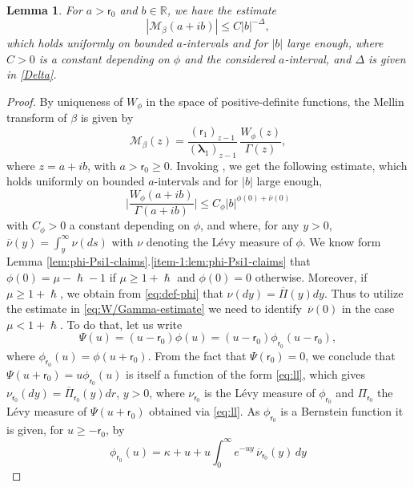 \documentclass[10pt]{amsart}
\theoremstyle{plain}
\newtheorem{lemma}[theorem]{Lemma}
\theoremstyle{definition}
\newcommand{\R}{\mathbb{R}}
\newcommand{\calM}{\mathcal{M}}
\newcommand{\lam}{{\bm{\lambda}_1}}
\newcommand{\tet}{{\mathsf{r}_0}}
\newcommand{\vat}{{\mathsf{r}_1}}
\let\h\hslash
\let\mo\mu
\let\bpsi\beta
\begin{document}
\begin{lemma}
\label{lem:Mellin-bpsi}
For $a > \tet$ and $b \in \R$, we have the estimate
\begin{equation*}
\left| \calM_\bpsi(a+ib) \right| \leq C|b|^{-\Delta},
\end{equation*}
which holds uniformly on bounded $a$-intervals and for $|b|$ large enough,
where $C > 0$ is a constant depending on $\phi$ and the considered $a$-interval, and $\Delta$ is given in \eqref{Delta}.
\end{lemma}

\begin{proof}
By uniqueness of $W_\phi$ in the space of positive-definite functions, the Mellin transform of $\bpsi$ is given by
\begin{equation*}
\calM_\bpsi(z) = \frac{(\vat)_{z-1}}{(\lam)_{z-1}}\,\frac{W_\phi(z)}{\Gamma(z)},
\end{equation*}
where $z = a+ib$, with $a > \tet \geq 0$. Invoking \cite[Eq.\,(6.20)]{Patie-Savov-Bern}, we get the following estimate, which holds uniformly on bounded $a$-intervals and for $|b|$ large enough,
\begin{equation}
\label{eq:W/Gamma-estimate}
\biggl| \frac{W_\phi(a+ib)}{\Gamma(a+ib)}\biggr| \leq C_\phi |b|^{\phi(0)+\overline{\nu}(0)}
\end{equation}
with $C_\phi > 0$ a constant depending on $\phi$, and where, for any $y > 0$, $\overline{\nu}(y) = \int_y^\infty \nu(ds)$ with $\nu$ denoting the Lévy measure of $\phi$. We know form Lemma \ref{lem:phi-Psi1-claims}.\eqref{item-1:lem:phi-Psi1-claims}
that $\phi(0) = \mo-\h - 1$ if $\mo \ge 1+\h$ and $\phi(0) = 0$ otherwise.
Moreover, if $\mo \ge 1+\h$, we obtain from \eqref{eq:def-phi} that $\nu(dy) = \overline{\Pi}(y)dy$.
Thus to utilize the estimate in \eqref{eq:W/Gamma-estimate} we need to identify~$\overline{\nu}(0)$ in the case $\mo < 1+\h$. To do that, let us write
\[
\Psi(u) = (u-\tet)\phi(u) = (u-\tet)\phi_{\tet}(u-\tet),
\]
where $\phi_{\tet}(u) = \phi(u+\tet)$. From the fact that $\Psi(\tet)=0$, we conclude that $\Psi(u+\tet) = u\phi_{\tet}(u)$ is itself a function of the form \eqref{eq:ll}, which gives $\nu_{\tet}(dy) = \overline{\Pi}_{\tet}(y)dr$, $y>0$, where $\nu_{\tet}$ is the Lévy measure of $\phi_{\tet}$ and
$\Pi_{\tet}$ the Lévy measure of $\Psi(u+\tet)$ obtained via \eqref{eq:ll}. As $\phi_{\tet}$ is a Bernstein function it is given, for $u \geq -\tet$, by
\begin{equation*}
\phi_{\tet}(u) = \kappa+u+u\int_0^\infty e^{-uy}\, \overline{\nu}_{\tet}(y)\,dy

\end{equation*}
\end{proof}
\end{document}
